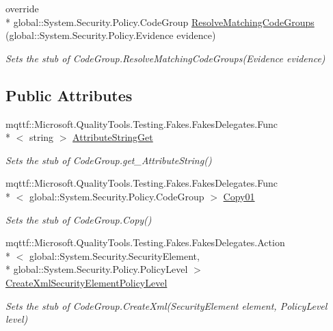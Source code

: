\begin{DoxyCompactItemize}
override \\*
global\-::\-System.\-Security.\-Policy.\-Code\-Group \hyperlink{class_system_1_1_security_1_1_policy_1_1_fakes_1_1_stub_code_group_a0ba37ef4aad79161d0983b304b402179}{Resolve\-Matching\-Code\-Groups} (global\-::\-System.\-Security.\-Policy.\-Evidence evidence)
\begin{DoxyCompactList}\small\item\em Sets the stub of Code\-Group.\-Resolve\-Matching\-Code\-Groups(\-Evidence evidence)\end{DoxyCompactList}\end{DoxyCompactItemize}
\subsection*{Public Attributes}
\begin{DoxyCompactItemize}
\item 
mqttf\-::\-Microsoft.\-Quality\-Tools.\-Testing.\-Fakes.\-Fakes\-Delegates.\-Func\\*
$<$ string $>$ \hyperlink{class_system_1_1_security_1_1_policy_1_1_fakes_1_1_stub_code_group_a9c4099647bf44042d87d1bcae28537e0}{Attribute\-String\-Get}
\begin{DoxyCompactList}\small\item\em Sets the stub of Code\-Group.\-get\-\_\-\-Attribute\-String()\end{DoxyCompactList}\item 
mqttf\-::\-Microsoft.\-Quality\-Tools.\-Testing.\-Fakes.\-Fakes\-Delegates.\-Func\\*
$<$ global\-::\-System.\-Security.\-Policy.\-Code\-Group $>$ \hyperlink{class_system_1_1_security_1_1_policy_1_1_fakes_1_1_stub_code_group_a3a49345363b819a16ffb037c4a7b25ca}{Copy01}
\begin{DoxyCompactList}\small\item\em Sets the stub of Code\-Group.\-Copy()\end{DoxyCompactList}\item 
mqttf\-::\-Microsoft.\-Quality\-Tools.\-Testing.\-Fakes.\-Fakes\-Delegates.\-Action\\*
$<$ global\-::\-System.\-Security.\-Security\-Element, \\*
global\-::\-System.\-Security.\-Policy.\-Policy\-Level $>$ \hyperlink{class_system_1_1_security_1_1_policy_1_1_fakes_1_1_stub_code_group_a3b63b21578ab18e58c8c3b5360dbcaeb}{Create\-Xml\-Security\-Element\-Policy\-Level}
\begin{DoxyCompactList}\small\item\em Sets the stub of Code\-Group.\-Create\-Xml(\-Security\-Element element, Policy\-Level level)\end{DoxyCompactList}\item 

\end{DoxyCompactItemize}
